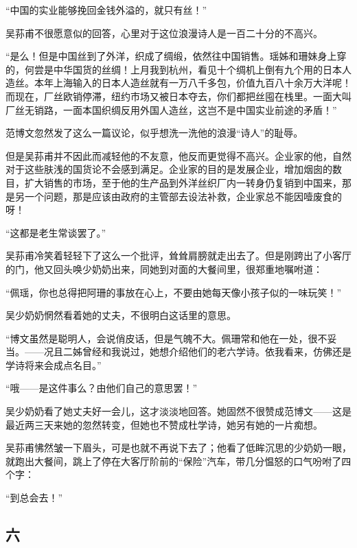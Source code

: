 \par “中国的实业能够挽回金钱外溢的，就只有丝！”
\par 吴荪甫不很愿意似的回答，心里对于这位浪漫诗人是一百二十分的不高兴。
\par “是么！但是中国丝到了外洋，织成了绸缎，依然往中国销售。瑶姊和珊妹身上穿的，何尝是中华国货的丝绸！上月我到杭州，看见十个绸机上倒有九个用的日本人造丝。本年上海输入的日本人造丝就有一万八千多包，价值九百八十余万大洋呢！而现在，厂丝欧销停滞，纽约市场又被日本夺去，你们都把丝囤在栈里。一面大叫厂丝无销路，一面本国织绸反用外国人造丝，这岂不是中国实业前途的矛盾！”
\par 范博文忽然发了这么一篇议论，似乎想洗一洗他的浪漫“诗人”的耻辱。
\par 但是吴荪甫并不因此而减轻他的不友意，他反而更觉得不高兴。企业家的他，自然对于这些肤浅的国货论不会感到满足。企业家的目的是发展企业，增加烟囱的数目，扩大销售的市场，至于他的生产品到外洋丝织厂内一转身仍复销到中国来，那是另一个问题，那是应该由政府的主管部去设法补救，企业家总不能因噎废食的呀！
\par “这都是老生常谈罢了。”
\par 吴荪甫冷笑着轻轻下了这么一个批评，耸耸肩膀就走出去了。但是刚跨出了小客厅的门，他又回头唤少奶奶出来，同她到对面的大餐间里，很郑重地嘱咐道：
\par “佩瑶，你也总得把阿珊的事放在心上，不要由她每天像小孩子似的一味玩笑！”
\par 吴少奶奶惘然看着她的丈夫，不很明白这话里的意思。
\par “博文虽然是聪明人，会说俏皮话，但是气魄不大。佩珊常和他在一处，很不妥当。——况且二姊曾经和我说过，她想介绍他们的老六学诗。依我看来，仿佛还是学诗将来会成点名目。”
\par “哦——是这件事么？由他们自己的意思罢！”
\par 吴少奶奶看了她丈夫好一会儿，这才淡淡地回答。她固然不很赞成范博文——这是最近两三天来她的忽然转变，但她也不赞成杜学诗，她另有她的一片痴想。
\par 吴荪甫怫然皱一下眉头，可是也就不再说下去了；他看了低眸沉思的少奶奶一眼，就跑出大餐间，跳上了停在大客厅阶前的“保险”汽车，带几分愠怒的口气吩咐了四个字：
\par “到总会去！”


\subsection*{六}


